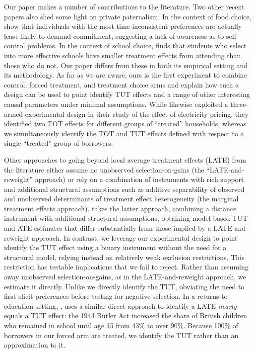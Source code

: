 \documentclass[oneside,11pt]{article}
\begin{document}
Our paper makes a number of contributions to the literature.   Two other recent papers also shed some light on private paternalism. In the context of food choice, \cite{Sprenger} show that individuals with the most time-inconsistent preferences are actually least likely to demand commitment, suggesting a lack of awareness as to self-control problems. In the context of school choice, \cite{Walters} finds that students who select into more effective schools have smaller treatment effects from attending than those who do not. Our paper differs from these in both its empirical setting and its methodology. As far as we are aware, ours is the first experiment to combine control, forced treatment, and treatment choice arms and explain how such a design can be used to point identify TUT effects and a range of other interesting causal parameters under minimal assumptions. While \cite{fowlie2021default} likewise exploited a three-armed experimental design in their study of the effect of electricity pricing, they identified two TOT effects for different groups of ``treated'' households, whereas we simultaneously identify the TOT and TUT effects defined with respect to a single ``treated'' group of borrowers.

Other approaches to going beyond local average treatment effects (LATE) from the literature either assume no unobserved selection-on-gains \citep{aronow2013beyond,angrist2013extrapolate} (the ``LATE-and-reweight'' approach) or rely on a combination of instruments with rich support and additional structural assumptions such as additive separability of observed and unobserved determinants of treatment effect heterogeneity \citep{heckman2007econometric, cornelissen2018benefits} (the marginal treatment effects approach).  \cite{Walters} takes the latter approach, combining a distance instrument with additional structural assumptions, obtaining model-based TUT and ATE estimates that differ substantially from those implied by a LATE-and-reweight approach. In contrast, we leverage our experimental design to point identify the TUT effect using a binary instrument without the need for a structural model, relying instead on relatively weak exclusion restrictions. This restriction has testable implications that we fail to reject. Rather than assuming away unobserved selection-on-gains, as in the LATE-and-reweight approach, we estimate it directly. Unlike \cite{Sprenger} we directly identify the TUT, obviating the need to first elicit preferences before testing for negative selection.  In a returns-to-education setting, \cite{oreopoulos2006estimating}, uses a similar direct approach to identify a LATE \emph{nearly} equals a TUT effect: the 1944 Butler Act increased the share of British children who remained in school until age 15 from 43\% to over 90\%. Because 100\% of borrowers in our forced arm are treated, we identify the TUT rather than an approximation to it.
\end{document}
